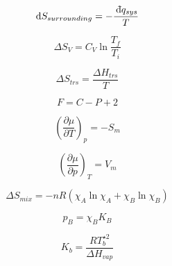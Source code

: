 \documentclass[12pt, letterpaper]{memoir}
\begin{document}
\begin{minipage}[t]{0.5\linewidth}	
	\begin{equation*}
		\mathrm{d} S_{surrounding} = -\dfrac{~\dbar q_{sys}}{T}
	\end{equation*}	
	
	\begin{equation*}
		\Delta S_V=C_V\ln\dfrac{T_f}{T_i}
	\end{equation*}	
	
	\begin{equation*}
		\Delta S_{trs}=\dfrac{\Delta H_{trs}}{T}
	\end{equation*}
	
	\begin{equation*}
		F=C-P+2
	\end{equation*}
	
	\begin{equation*}
		\left(\dfrac{\partial \mu}{\partial T}\right)_p=-S_m
	\end{equation*}
	
	\begin{equation*}
		\left(\dfrac{\partial \mu}{\partial p}\right)_T=V_m
	\end{equation*}
	
	\begin{equation*}
		\Delta S_{mix} = -nR\left(\chi_A\ln\chi_A+\chi_B\ln\chi_B\right)
	\end{equation*}
	
	\begin{equation*}
		p_B=\chi_BK_B
	\end{equation*}
	
	\begin{equation*}
		K_b=\frac{RT^{\star 2}_b}{\Delta H_{vap}}
	\end{equation*}	
\end{minipage}
\end{document}
